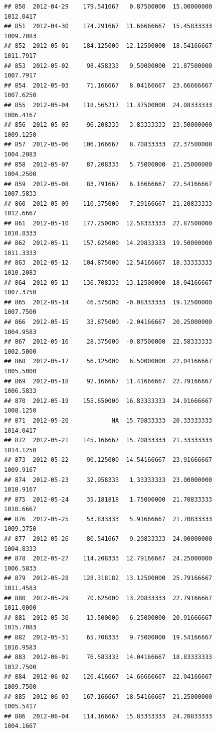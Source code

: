 \documentclass[
]{article}
\begin{document}
\begin{verbatim}
## 850  2012-04-29    179.541667   0.87500000  15.00000000    1012.0417
## 851  2012-04-30    174.291667  11.66666667  15.45833333    1009.7083
## 852  2012-05-01    184.125000  12.12500000  18.54166667    1011.7917
## 853  2012-05-02     98.458333   9.50000000  21.87500000    1007.7917
## 854  2012-05-03     71.166667   8.04166667  23.66666667    1007.6250
## 855  2012-05-04    118.565217  11.37500000  24.08333333    1006.4167
## 856  2012-05-05     96.208333   3.83333333  23.50000000    1009.1250
## 857  2012-05-06    106.166667   8.70833333  22.37500000    1004.2083
## 858  2012-05-07     87.208333   5.75000000  21.25000000    1004.2500
## 859  2012-05-08     83.791667   6.16666667  22.54166667    1007.5833
## 860  2012-05-09    110.375000   7.29166667  21.20833333    1012.6667
## 861  2012-05-10    177.250000  12.58333333  22.87500000    1010.8333
## 862  2012-05-11    157.625000  14.20833333  19.50000000    1011.3333
## 863  2012-05-12    104.875000  12.54166667  18.33333333    1010.2083
## 864  2012-05-13    136.708333  13.12500000  18.04166667    1007.3750
## 865  2012-05-14     46.375000  -0.08333333  19.12500000    1007.7500
## 866  2012-05-15     33.875000  -2.04166667  20.25000000    1004.9583
## 867  2012-05-16     28.375000  -0.87500000  22.58333333    1002.5000
## 868  2012-05-17     56.125000   6.50000000  22.04166667    1005.5000
## 869  2012-05-18     92.166667  11.41666667  22.79166667    1006.5833
## 870  2012-05-19    155.650000  16.83333333  24.91666667    1008.1250
## 871  2012-05-20            NA  15.70833333  20.33333333    1014.0417
## 872  2012-05-21    145.166667  15.70833333  21.33333333    1014.1250
## 873  2012-05-22     90.125000  14.54166667  23.91666667    1009.9167
## 874  2012-05-23     32.958333   1.33333333  23.00000000    1010.9167
## 875  2012-05-24     35.181818   1.75000000  21.70833333    1010.6667
## 876  2012-05-25     53.833333   5.91666667  21.70833333    1009.3750
## 877  2012-05-26     80.541667   9.20833333  24.00000000    1004.8333
## 878  2012-05-27    114.208333  12.79166667  24.25000000    1006.5833
## 879  2012-05-28    128.318182  13.12500000  25.79166667    1011.4583
## 880  2012-05-29     70.625000  13.20833333  22.79166667    1011.0000
## 881  2012-05-30     13.500000   6.25000000  20.91666667    1015.7083
## 882  2012-05-31     65.708333   9.75000000  19.54166667    1016.9583
## 883  2012-06-01     76.583333  14.04166667  18.83333333    1012.7500
## 884  2012-06-02    126.416667  14.66666667  22.04166667    1009.7500
## 885  2012-06-03    167.166667  18.54166667  21.25000000    1005.5417
## 886  2012-06-04    114.166667  15.83333333  24.20833333    1004.1667

\end{verbatim}
\end{document}
